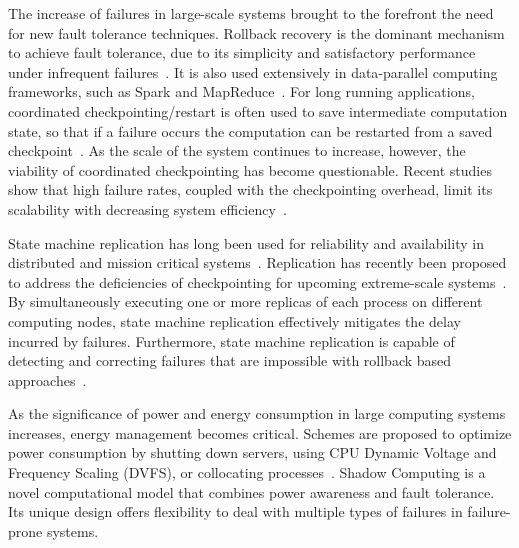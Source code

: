 The increase of failures in large-scale systems
brought to the forefront the need for new fault tolerance techniques. 
Rollback recovery is the dominant mechanism to achieve
fault tolerance, due to its simplicity and satisfactory performance under infrequent failures~\cite{elnozahy2002survey}. It is also used extensively in data-parallel computing frameworks, such as Spark and MapReduce~\cite{Dean2004,Zaharia180560}. For long running applications, coordinated checkpointing/restart is often used to save intermediate computation state, so that if a failure occurs the computation can be restarted from a saved checkpoint~\cite{agarwal2004adaptive,elnozahy2004checkpointing,zheng2004ftc,moody2010design}. As the scale of the system continues to increase, however, the viability of coordinated checkpointing has become questionable. Recent studies show that high failure rates, coupled with the checkpointing overhead, limit its scalability with decreasing system efficiency~\cite{cappello2009fault,ferreira2011evaluating}. 

State machine replication has long
been used for reliability and availability in distributed and
mission critical systems~\cite{schneider1990implementing}. Replication has recently been
proposed to address the deficiencies of checkpointing for upcoming extreme-scale systems~\cite{ferreira2011evaluating,engelmann2011redundant,elliott2012combining}. 
By simultaneously executing one or more replicas of each process on different computing nodes, state machine replication effectively mitigates the delay incurred by failures. Furthermore, state machine replication is capable of detecting and correcting failures that are impossible with rollback based approaches~\cite{fiala2012detection}. %

As the significance of power and energy consumption in large computing systems increases, energy management becomes critical. Schemes are proposed to optimize power consumption by shutting down servers, using CPU Dynamic Voltage and Frequency Scaling (DVFS), or collocating processes~\cite{sarood2014maximizing,yu2015energy,Pillai2001,7816907}. Shadow Computing is a novel computational model that combines power awareness and fault tolerance. Its unique design offers flexibility to deal with multiple types of failures in failure-prone systems.